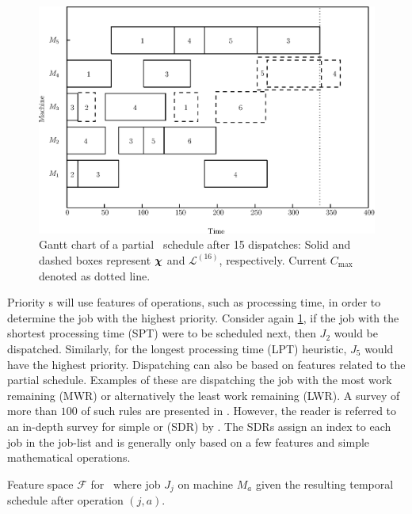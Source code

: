 \documentclass[twocolumn]{svjour3}
\begin{document}
\begin{figure}[t!]\centering
\includegraphics[width=\columnwidth]{figures/jssp_example}
\caption[Gantt chart of a partial \JSP\ schedule]{Gantt chart of a
partial \JSP\ schedule after 15 dispatches: Solid and dashed boxes
represent $\bm \chi$ and $\mathcal{L}^{(16)}$, respectively. Current
$C_{\max}$ denoted as dotted line.}
\label{fig:jssp:example}
\end{figure}


Priority \dr s will use features of operations, such as processing time, 
in order to determine the job with the highest priority. 
Consider again \cref{fig:jssp:example}, if the job with the shortest processing 
time (SPT) were to be scheduled next, then $J_2$ would be dispatched. 
Similarly, for the longest processing time (LPT) heuristic, $J_5$ would have 
the highest priority. 
Dispatching can also be based on features related to the partial schedule. 
Examples of these are dispatching the job with the most work remaining (MWR) or 
alternatively the least work remaining (LWR). A survey of more than $100$ of 
such rules are presented in \cite{Panwalkar77}. 
However, the reader is referred to an in-depth survey for simple or 
\emph{\sdr} (SDR) by \cite{Haupt89}. 
The SDRs assign an index to each job in the job-list and is generally only 
based on a few features and simple mathematical operations.

\begin{table}[t!] \centering
\caption[Feature space $\mathcal{F}$ for \JSP]{Feature space 
$\mathcal{F}$ for \JSP\ where job $J_j$ on machine $M_a$ given the 
resulting temporal schedule after operation $(j,a)$.
}
\label{tbl:jssp:feat}
{\setlength{\tabcolsep}{3pt} }
\end{table}
\end{document}
